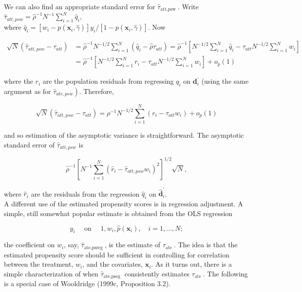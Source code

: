 \documentclass[10pt]{article}
\begin{document}
We can also find an appropriate standard error for $\hat{\tau}_{\text {att,psw }}$. Write\\
$\hat{\tau}_{a t t, p s w}=\hat{\rho}^{-1} N^{-1} \sum_{i=1}^{N} \hat{q}_{i}$,\\
where $\hat{q}_{i}=\left[w_{i}-p\left(\mathbf{x}_{i}, \hat{\gamma}\right)\right] y_{i} /\left[1-p\left(\mathbf{x}_{i}, \hat{\gamma}\right)\right]$. Now

$$
\begin{aligned}
\sqrt{N}\left(\hat{\tau}_{a t t, p s w}-\tau_{a t t}\right) & =\hat{\rho}^{-1} N^{-1 / 2} \sum_{i=1}^{N}\left(\hat{q}_{i}-\hat{\rho} \tau_{a t t}\right)=\hat{\rho}^{-1}\left[N^{-1 / 2} \sum_{i=1}^{N} \hat{q}_{i}-\tau_{a t t} N^{-1 / 2} \sum_{i=1}^{N} w_{i}\right] \\
& =\hat{\rho}^{-1}\left[N^{-1 / 2} \sum_{i=1}^{N} r_{i}-\tau_{a t t} N^{-1 / 2} \sum_{i=1}^{N} w_{i}\right]+o_{p}(1)
\end{aligned}
$$

where the $r_{i}$ are the population residuals from regressing $q_{i}$ on $\mathbf{d}_{i}^{\prime}$ (using the same argument as for $\left.\hat{\tau}_{a t e, p s w}\right)$. Therefore,

$$
\sqrt{N}\left(\hat{\tau}_{a t t, p s w}-\tau_{a t t}\right)=\rho^{-1} N^{-1 / 2} \sum_{i=1}^{N}\left(r_{i}-\tau_{a t t} w_{i}\right)+o_{p}(1)
$$

and so estimation of the asymptotic variance is straightforward. The asymptotic standard error of $\hat{\tau}_{a t t, p s w}$ is


\begin{equation*}
\hat{\rho}^{-1}\left[N^{-1} \sum_{i=1}^{N}\left(\hat{r}_{i}-\hat{\tau}_{a t t, p s w} w_{i}\right)^{2}\right]^{1 / 2} \sqrt{N}, \tag{21.48}
\end{equation*}


where $\hat{r}_{i}$ are the residuals from the regression $\hat{q}_{i}$ on $\hat{\mathbf{d}}_{i}^{\prime}$.\\
A different use of the estimated propensity scores is in regression adjustment. A simple, still somewhat popular estimate is obtained from the OLS regression


\begin{equation*}
y_{i} \quad \text { on } \quad 1, w_{i}, \hat{p}\left(\mathbf{x}_{i}\right), \quad i=1, \ldots, N ; \tag{21.49}
\end{equation*}


the coefficient on $w_{i}$, say, $\hat{\tau}_{\text {ate,psreg }}$, is the estimate of $\tau_{\text {ate }}$. The idea is that the estimated propensity score should be sufficient in controlling for correlation between the treatment, $w_{i}$, and the covariates, $\mathbf{x}_{i}$. As it turns out, there is a simple characterization of when $\hat{\tau}_{\text {ate,pseg }}$ consistently estimates $\tau_{\text {ate }}$. The following is a special case of Wooldridge (1999c, Proposition 3.2).
\end{document}
